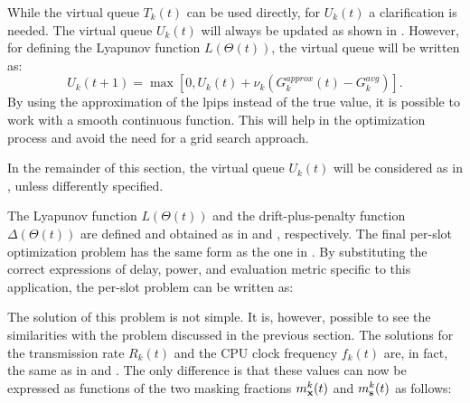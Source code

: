 While the virtual queue $T_k(t)$ can be used directly, for $U_k(t)$ a clarification is needed. The virtual queue $U_k(t)$ will always be updated as shown in . However, for defining the Lyapunov function $L(\Theta(t))$, the virtual queue will be written as: 
\begin{equation} 
    U_k(t+1) = \max [0,U_k(t) + \nu_k(G_k^{approx}(t) - G_k^{avg})]. \label{eq: EN_nn virtulQueue U_approx} 
\end{equation} 
By using the approximation of the \gls{lpips} instead of the true value, it is possible to work with a smooth continuous function. This will help in the optimization process and avoid the need for a grid search approach.

In the remainder of this section, the virtual queue $U_k(t)$ will be considered as in , unless differently specified.

The Lyapunov function $L(\Theta(t))$ and the drift-plus-penalty function $\Delta(\Theta(t))$ are defined and obtained as in  and , respectively. The final per-slot optimization problem has the same form as the one in . By substituting the correct expressions of delay, power, and evaluation metric specific to this application, the per-slot problem can be written as: 
The solution of this problem is not simple. It is, however, possible to see the similarities with the problem discussed in the previous section. The solutions for the transmission rate $R_k(t)$ and the CPU clock frequency $f_k(t)$ are, in fact, the same as in  and . The only difference is that these values can now be expressed as functions of the two masking fractions $m_{\mathbf{x}}^k(t)$ and $m_{\mathbf{s}}^k(t)$ as follows:

